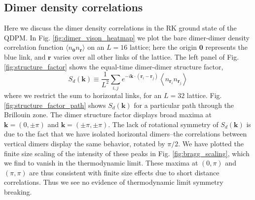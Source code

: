\documentclass[twocolumn,prb,aps,floatfix,superscriptaddress]{revtex4-1}
\newcommand{\figref}[1]{Fig. \ref{#1}}
\begin{document}
\subsection{Dimer density correlations}

Here we discuss the dimer density correlations in the RK ground state of the QDPM. In \figref{fig:dimer_vison_heatmap} we plot the bare dimer-dimer density correlation function $\langle n_{\bm{0}} n_{\bm{r}}\rangle$ on an $L=16$ lattice; here the origin $\bm{0}$ represents the blue link, and $\bm{r}$ varies over all other links of the lattice. The left panel of \figref{fig:structure_factor} shows the equal-time dimer-dimer structure factor, 
\begin{equation}
S_d\left( \bm{k} \right) \equiv \frac{1}{ L^2} \sum_{i,j} e^{-i \bm{k} \cdot \left(\bm{r}_i - \bm{r}_j\right)} \left \langle n_{\bm{r}_i} n_{\bm{r}_j} \right \rangle
\end{equation}
where we restrict the sum to horizontal links, for an $L=32$ lattice. \figref{fig:structure_factor_path} shows $S_d(\bm{k})$ for a particular path through the Brillouin zone. The dimer structure factor displays broad maxima at $\bm{k} = (0, \pm \pi)$ and $\bm{k} = (\pm \pi, \pm \pi)$. The lack of rotational symmetry of $S_d(\bm{k})$ is due to the fact that we have isolated horizontal dimers--the correlations between vertical dimers display the same behavior, rotated by $\pi/2$.
We have plotted the finite size scaling of the intensity of these peaks in  \figref{fig:bragg_scaling}, which we find to vanish in the thermodynamic limit. These maxima at $(0,\pi)$ and $(\pi,\pi)$ are thus consistent with finite size effects due to short distance correlations. Thus we see no evidence of thermodynamic limit symmetry breaking.
\end{document}
